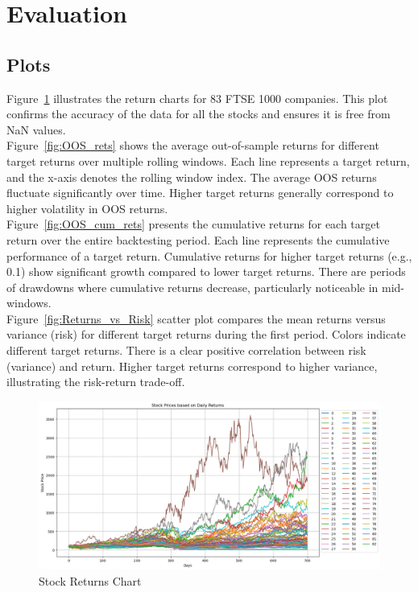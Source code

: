 \documentclass[12pt,twoside]{article}
\begin{document}
\section{Evaluation}

\subsection{Plots}
Figure~\ref{fig:Stock_rets} illustrates the return charts for 83 FTSE 1000 companies. This plot confirms the accuracy of the data for all the stocks and ensures it is free from NaN values.\\

Figure~\ref{fig:OOS_rets} shows the average out-of-sample returns for different target returns over multiple rolling windows. Each line represents a target return, and the x-axis denotes the rolling window index. The average OOS returns fluctuate significantly over time. Higher target returns generally correspond to higher volatility in OOS returns. \\

Figure~\ref{fig:OOS_cum_rets}  presents the cumulative returns for each target return over the entire backtesting period. Each line represents the cumulative performance of a target return. Cumulative returns for higher target returns (e.g., 0.1) show significant growth compared to lower target returns. There are periods of drawdowns where cumulative returns decrease, particularly noticeable in mid-windows.\\

Figure~\ref{fig:Returns_vs_Risk} scatter plot compares the mean returns versus variance (risk) for different target returns during the first period. Colors indicate different target returns. There is a clear positive correlation between risk (variance) and return. Higher target returns correspond to higher variance, illustrating the risk-return trade-off. 


\begin{figure}[]
    \centering
    \includegraphics[width = 1.0\hsize]{./figures/stock_returns.png}
    \caption{Stock Returns Chart}
    \label{fig:Stock_rets}
\end{figure}
\end{document}
